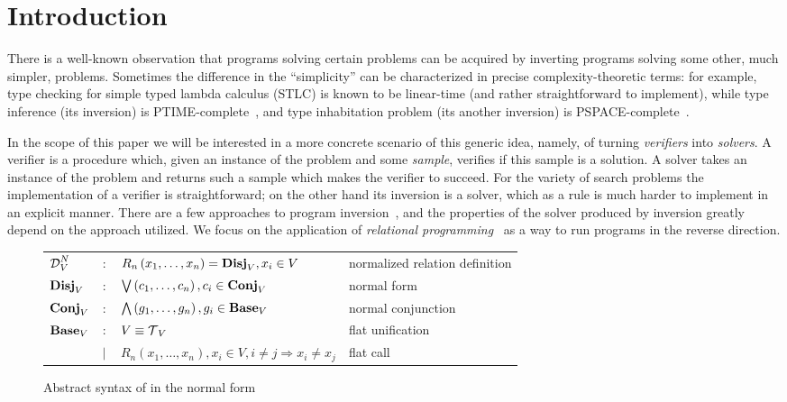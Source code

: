 \section{Introduction}


There is a well-known observation\cite{lozov2019relational,SemanticsModifiers1} that programs solving certain problems can be acquired by inverting programs solving some other, much simpler, problems.
Sometimes the difference in the ``simplicity'' can be characterized in precise complexity-theoretic terms: for example, type checking for simple typed lambda calculus (STLC) is known to be linear-time (and rather straightforward to implement), while type inference (its inversion) is PTIME-complete~\cite{mairson2004linear}, and type inhabitation problem (its another inversion) is PSPACE-complete~\cite{urzyczyn1997inhabitation}.

In the scope of this paper we will be interested in a more concrete scenario of this generic idea, namely, of turning \emph{verifiers} into \emph{solvers}.
A verifier is a procedure which, given an instance of the problem and some \emph{sample}, verifies if this sample is a solution.
A solver takes an instance of the problem and returns such a sample which makes the verifier to succeed.
For the variety of search problems the implementation of a verifier is straightforward; on the other hand its inversion is a solver, which as a rule is much harder to implement in an explicit manner.
There are a few approaches to program inversion~\cite{RevURA,aman2020foundations}, and the properties of the solver produced by inversion greatly depend on the approach utilized.
We focus on the application of \emph{relational programming}~\cite{TheReasonedSchemer} as a way to run programs in the reverse direction.


\begin{figure*}[t!]
    \begin{tabular}{llll}
        $\operatorname{\mathcal{D}}_{V}^N$ & $:$    & $R_{n}\left( x_1, \ldots, x_{n} \right) = \operatorname{\mathbf{Disj}}_{V}, x_{i}\in V$                        & normalized relation definition \\
        $\operatorname{\mathbf{Disj}}_{V}$  & $:$    & $\bigvee\left( c_1, \ldots, c_{n} \right), c_{i}\in \operatorname{\mathbf{Conj}}_{V}$                          & normal form                    \\
        $\operatorname{\mathbf{Conj}}_{V}$  & $:$    & $\bigwedge\left( g_1, \ldots, g_n \right), g_{i}\in \operatorname{\mathbf{Base}}_{V}$                          & normal conjunction             \\
        $\operatorname{\mathbf{Base}}_{V}$  & $:$    & $V \equiv \operatorname{\mathcal{T}}_{V}$                                                                & flat unification               \\
                     & $\mid$ & $R_{n}\left( x_1, \ldots, x_{n} \right), x_{i}\in V, i \neq j \Rightarrow x_i \neq x_j$ & flat call                      \\

    \end{tabular}
    \caption{Abstract syntax of \micro in the normal form}
    \label{fig:miniKanren}
\end{figure*}


